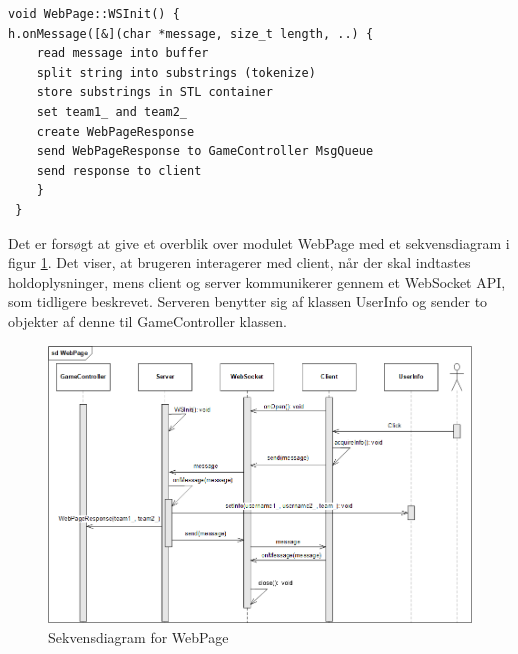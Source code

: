 \documentclass[Softwaredesign/Softwaredesign_main.tex]{subfiles}
\begin{document}
\newpage
\begin{lstlisting}
void WebPage::WSInit() {
h.onMessage([&](char *message, size_t length, ..) {
    read message into buffer
    split string into substrings (tokenize)
    store substrings in STL container
    set team1_ and team2_
    create WebPageResponse
    send WebPageResponse to GameController MsgQueue
    send response to client
    }
 }
\end{lstlisting}
Det er forsøgt at give et overblik over modulet WebPage med et sekvensdiagram i figur \ref{fig:WebPage_sd}. Det viser, at brugeren interagerer med client, når der skal indtastes holdoplysninger, mens client og server kommunikerer gennem et WebSocket API, som tidligere beskrevet. Serveren benytter sig af klassen UserInfo og sender to objekter af denne til GameController klassen.  
\begin{figure}[H]
    \centering
    \includegraphics[width=1\textwidth]{Softwaredesign/RPiApp/graphic_RPi/WebPage_sd_2.png}
    \caption{Sekvensdiagram for WebPage}
    \label{fig:WebPage_sd}
\end{figure}
\end{document}
